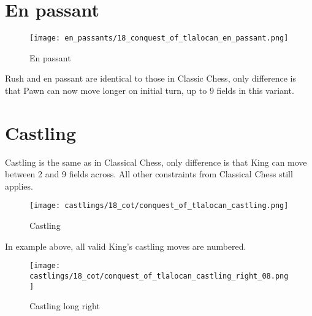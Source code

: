 


\clearpage %

\section*{En passant}

\noindent
\begin{wrapfigure}{l}{0.4\textwidth}
\centering
\texttt{[image: en\_passants/18\_conquest\_of\_tlalocan\_en\_passant.png]}
\caption{En passant}
\label{fig:18_conquest_of_tlalocan_en_passant}
\end{wrapfigure}
Rush and en passant are identical to those in Classic Chess, only difference
is that Pawn can now move longer on initial turn, up to 9 fields in this
variant.

\clearpage %

\section*{Castling}

Castling is the same as in Classical Chess, only difference is that King can move between 2 and 9 fields across.
All other constraints from Classical Chess still applies.

\noindent
\begin{figure}[!h]
\texttt{[image: castlings/18\_cot/conquest\_of\_tlalocan\_castling.png]}
\caption{Castling}
\label{fig:conquest_of_tlalocan_castling}
\end{figure}

In example above, all valid King's castling moves are numbered.

\noindent
\begin{figure}[!h]
\texttt{[image: castlings/18\_cot/conquest\_of\_tlalocan\_castling\_right\_08.png]}
\caption{Castling long right}
\label{fig:conquest_of_tlalocan_castling_right_08}
\end{figure}

